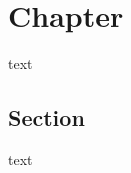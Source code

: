 \chapter{Chapter}
\label{ch:Chapter}
text

\section{Section}
\label{sec:Section}
text \par
\vspace{\baselineskip}
\noindent